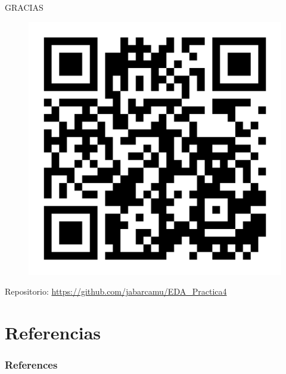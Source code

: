 \documentclass[11pt]{beamer}
\begin{document}
		\begin{frame}{}
		    \centering
		    
		    {
		        \Large
		        GRACIAS
		    }
		    
		    \begin{figure}[H]
				\centering
				\includegraphics[scale=0.1]{img/qr_repositorio.png}
				
				\label{fig:qr_repositorio}
			\end{figure}
			
			Repositorio: \url{https://github.com/jabarcamu/EDA_Practica4}
		    
		\end{frame}

\section{Referencias}



\begin{frame}[t, allowframebreaks]
    \frametitle{References}
    
    
\end{frame}
\end{document}
